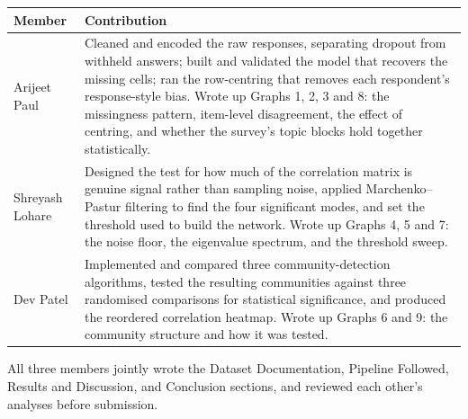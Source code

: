 \documentclass{article}
\begin{document}
\begin{center}
\footnotesize
\begin{tabular}{p{}p{}}
\toprule
Member & Contribution \\
\midrule
Arijeet Paul &
Cleaned and encoded the raw responses, separating dropout from withheld
answers; built and validated the model that recovers the missing cells; ran
the row-centring that removes each respondent's response-style bias. Wrote up
Graphs 1, 2, 3 and 8: the missingness pattern, item-level disagreement, the
effect of centring, and whether the survey's topic blocks hold together
statistically. \\
\addlinespace
Shreyash Lohare &
Designed the test for how much of the correlation matrix is genuine signal
rather than sampling noise, applied Marchenko--Pastur filtering to find the
four significant modes, and set the threshold used to build the network. Wrote
up Graphs 4, 5 and 7: the noise floor, the eigenvalue spectrum, and the
threshold sweep. \\
\addlinespace
Dev Patel &
Implemented and compared three community-detection algorithms, tested the
resulting communities against three randomised comparisons for statistical
significance, and produced the reordered correlation heatmap. Wrote up Graphs
6 and 9: the community structure and how it was tested. \\
\bottomrule
\end{tabular}
\end{center}

\noindent
All three members jointly wrote the Dataset Documentation, Pipeline Followed,
Results and Discussion, and Conclusion sections, and reviewed each other's
analyses before submission.
\end{document}
